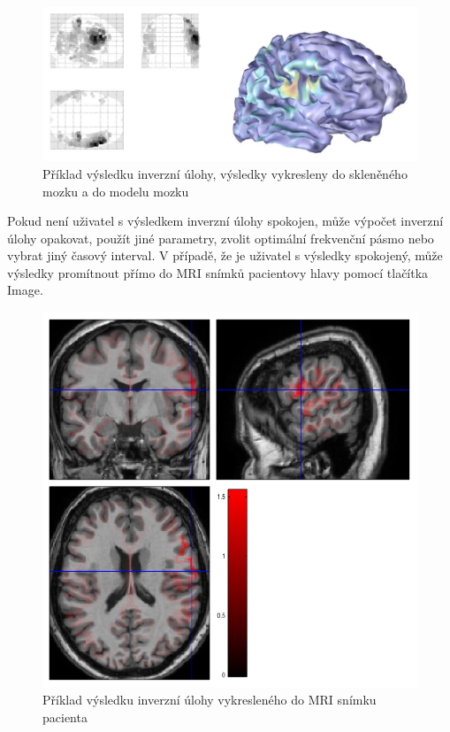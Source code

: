 \begin{figure}[!h]
\includegraphics[width=1.0\textwidth]{casti/implementace/sourceReconstruction/render.jpg}
\caption{Příklad výsledku inverzní úlohy, výsledky vykresleny do skleněného mozku a do modelu mozku}
\label{prikladVysledku}
\end{figure}

Pokud není uživatel s výsledkem inverzní úlohy spokojen, může výpočet inverzní úlohy opakovat, použít jiné parametry, zvolit optimální frekvenční pásmo nebo vybrat jiný časový interval. V případě, že je uživatel s výsledky spokojený, může výsledky promítnout přímo do MRI snímků pacientovy hlavy pomocí tlačítka Image.
 
\begin{figure}[!h]
\includegraphics[scale = 0.4]{casti/implementace/sourceReconstruction/vysledek.png}
\caption{Příklad výsledku inverzní úlohy vykresleného do MRI snímku pacienta}
\label{vysledkyMRIsnimek}
\end{figure}

